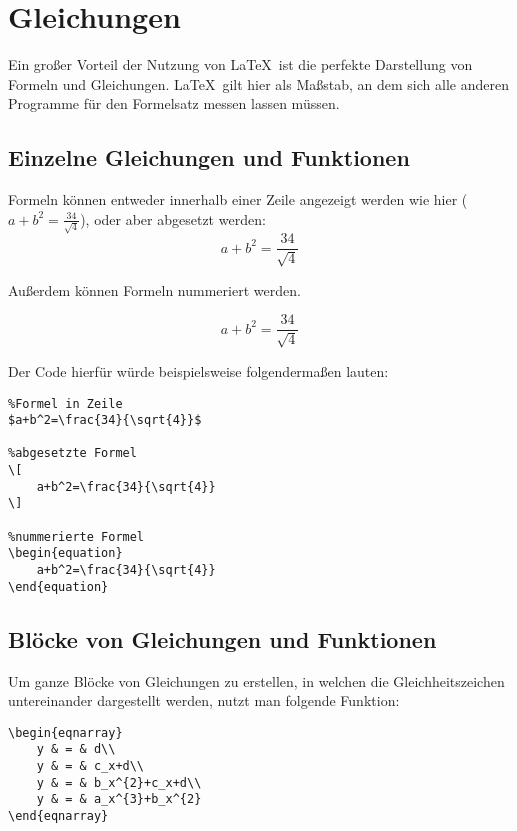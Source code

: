 
\chapter{Gleichungen}
Ein großer Vorteil der Nutzung von \LaTeX\ ist die perfekte Darstellung von Formeln und Gleichungen. 
\LaTeX\ gilt hier als Maßstab, an dem sich alle anderen Programme für den Formelsatz messen lassen müssen.

\section{Einzelne Gleichungen und Funktionen}
Formeln können entweder innerhalb einer Zeile angezeigt werden wie hier ($a+b^2=\frac{34}{\sqrt{4}}$), oder aber abgesetzt werden:
\[
    a+b^2=\frac{34}{\sqrt{4}}
\]

Außerdem können Formeln nummeriert werden.

\begin{equation}
    a+b^2=\frac{34}{\sqrt{4}}
\end{equation}

Der Code hierfür würde beispielsweise folgendermaßen lauten:
\begin{lstlisting}
%Formel in Zeile
$a+b^2=\frac{34}{\sqrt{4}}$

%abgesetzte Formel
\[
    a+b^2=\frac{34}{\sqrt{4}}
\]

%nummerierte Formel
\begin{equation}
    a+b^2=\frac{34}{\sqrt{4}}
\end{equation}
\end{lstlisting}

\section{Blöcke von Gleichungen und Funktionen}

Um ganze Blöcke von Gleichungen zu erstellen, in welchen die Gleichheitszeichen untereinander dargestellt werden, nutzt man folgende Funktion:

\begin{lstlisting}
\begin{eqnarray}
    y & = & d\\
    y & = & c_x+d\\
    y & = & b_x^{2}+c_x+d\\
    y & = & a_x^{3}+b_x^{2}
\end{eqnarray}
\end{lstlisting}

